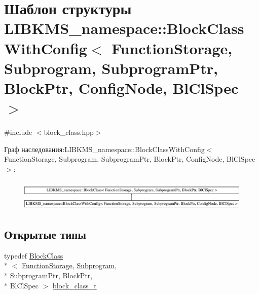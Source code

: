 \hypertarget{structLIBKMS__namespace_1_1BlockClassWithConfig}{\section{Шаблон структуры L\-I\-B\-K\-M\-S\-\_\-namespace\-:\-:Block\-Class\-With\-Config$<$ Function\-Storage, Subprogram, Subprogram\-Ptr, Block\-Ptr, Config\-Node, Bl\-Cl\-Spec $>$}
\label{structLIBKMS__namespace_1_1BlockClassWithConfig}
}


{\ttfamily \#include $<$block\-\_\-class.\-hpp$>$}

Граф наследования\-:L\-I\-B\-K\-M\-S\-\_\-namespace\-:\-:Block\-Class\-With\-Config$<$ Function\-Storage, Subprogram, Subprogram\-Ptr, Block\-Ptr, Config\-Node, Bl\-Cl\-Spec $>$\-:\begin{figure}[H]
\begin{center}
\leavevmode
\includegraphics[height=1.499331cm]{structLIBKMS__namespace_1_1BlockClassWithConfig}
\end{center}
\end{figure}
\subsection*{Открытые типы}
\begin{DoxyCompactItemize}
\item 
typedef \hyperlink{classLIBKMS__namespace_1_1BlockClass}{Block\-Class}\\*
$<$ \hyperlink{classLIBKMS__namespace_1_1FunctionStorage}{Function\-Storage}, \hyperlink{classLIBKMS__namespace_1_1Subprogram}{Subprogram}, \\*
Subprogram\-Ptr, Block\-Ptr, \\*
Bl\-Cl\-Spec $>$ \hyperlink{structLIBKMS__namespace_1_1BlockClassWithConfig_a9a90d09b791c08682e6bc111072d87de}{block\-\_\-class\-\_\-t}
\end{DoxyCompactItemize}

